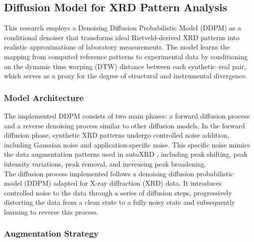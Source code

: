 \subsection{Diffusion Model for XRD Pattern Analysis}

This research employs a Denoising Diffusion Probabilistic Model (DDPM) \cite{ho2020denoising}
as a conditional denoiser that transforms ideal Rietveld-derived XRD patterns into realistic approximations of laboratory measurements.
The model learns the mapping from computed reference patterns to experimental data by conditioning on the dynamic time warping (DTW) distance between each synthetic--real pair, which serves as a proxy for the degree of structural and instrumental divergence.

\subsubsection{Model Architecture}

The implemented DDPM consists of two main phases: a forward diffusion process and a reverse denoising process similar to other diffusion models.
In the forward diffusion phase, synthetic XRD patterns undergo controlled noise addition, including Gaussian noise and application-specific noise.
This specific noise mimics the data augmentation patterns used in autoXRD \cite{szymanski2021probabilistic}, including peak shifting, peak intensity variations, peak removal, and increasing peak broadening. \\

The diffusion process implemented follows a denoising diffusion probabilistic model (DDPM) adapted for X-ray diffraction (XRD) data.
It introduces controlled noise to the data through a series of diffusion steps, progressively distorting the data from a clean state to a fully noisy state and subsequently learning to reverse this process.\\

\subsubsection{Augmentation Strategy}


